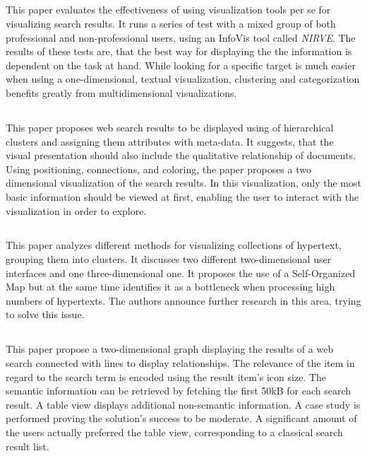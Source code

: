 \subsection{\cite{Sebrechts1999}}
This paper evaluates the effectiveness of using visualization tools per se for visualizing search results. It runs a series of test with a mixed group of both professional and non-professional users, using an InfoVis tool called \emph{NIRVE}. The results of these tests are, that the best way for displaying the the information is dependent on the task at hand. While looking for a specific target is much easier when using a one-dimensional, textual visualization, clustering and categorization benefits greatly from multidimensional visualizations.

\subsection{\cite{Tvarozek2008}}
This paper proposes web search results to be displayed using of hierarchical clusters and assigning them attributes with meta-data. It suggests, that the visual presentation should also include the qualitative relationship of documents. Using positioning, connections, and coloring, the paper proposes a two dimensional visualization of the search results. In this visualization, only the most basic information should be viewed at first, enabling the user to interact with the visualization in order to explore.

\subsection{\cite{Weippl2001}}
This paper analyzes different methods for visualizing collections of hypertext, grouping them into clusters. It discusses two different two-dimensional user interfaces and one three-dimensional one. It proposes the use of a Self-Organized Map but at the same time identifies it as a bottleneck when processing high numbers of hypertexts. The authors announce further research in this area, trying to solve this issue.

\subsection{\cite{Zaina2005}}
This paper propose a two-dimensional graph displaying the results of a web search connected with lines to display relationships. The relevance of the item in regard to the search term is encoded using the result item's icon size. The semantic information can be retrieved by fetching the first 50kB for each search result. A table view displays additional non-semantic information. A case study is performed proving the solution's success to be moderate. A significant amount of the users actually preferred the table view, corresponding to a classical search result list.
